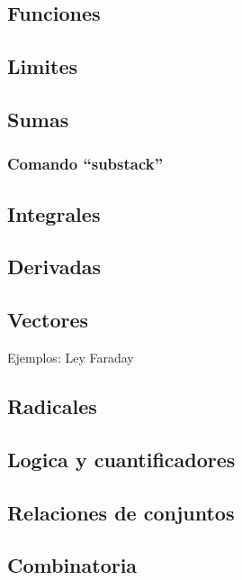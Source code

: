 \documentclass[../notes.tex]{subfiles}
\begin{document}
        \subsection{Funciones}
        \subsection{Limites}
        \subsection{Sumas}
            \subsubsection{Comando ``substack''}
        \subsection{Integrales}
        \subsection{Derivadas}
        \subsection{Vectores}
            Ejemplos: Ley Faraday
    
        \subsection{Radicales}
        
        \subsection{Logica y cuantificadores}
        
        \subsection{Relaciones de conjuntos}
        
        \subsection{Combinatoria} 
        
\end{document}
